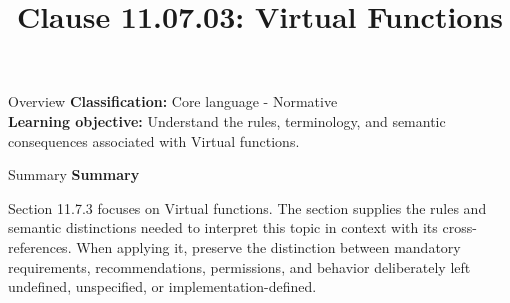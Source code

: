 \documentclass[10pt,letterpaper]{article}
\title{Clause 11.07.03: Virtual Functions}
\author{}
\date{}
\begin{document}
\maketitle
\begin{CornellOverviewBox}{Overview}
\textbf{Classification:} Core language - Normative\\[2pt]
\textbf{Learning objective:} Understand the rules, terminology, and semantic consequences associated with Virtual functions.
\end{CornellOverviewBox}\begin{CornellSummaryBox}{Summary}
{\sffamily\bfseries\color{Accent} Summary}\par\vspace{3pt}Section 11.7.3 focuses on Virtual functions. The section supplies the rules and semantic distinctions needed to interpret this topic in context with its cross-references. When applying it, preserve the distinction between mandatory requirements, recommendations, permissions, and behavior deliberately left undefined, unspecified, or implementation-defined.
\end{CornellSummaryBox}
\end{document}
